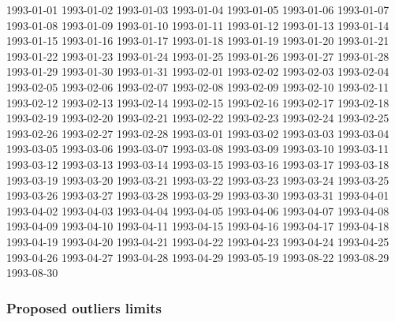 \documentclass[
  10pt,
  a4paper,oneside]{article}
\begin{document}
1993-01-01 1993-01-02 1993-01-03 1993-01-04 1993-01-05 1993-01-06 1993-01-07 1993-01-08 1993-01-09 1993-01-10 1993-01-11 1993-01-12 1993-01-13 1993-01-14 1993-01-15 1993-01-16 1993-01-17 1993-01-18 1993-01-19 1993-01-20 1993-01-21 1993-01-22 1993-01-23 1993-01-24 1993-01-25 1993-01-26 1993-01-27 1993-01-28 1993-01-29 1993-01-30 1993-01-31 1993-02-01 1993-02-02 1993-02-03 1993-02-04 1993-02-05 1993-02-06 1993-02-07 1993-02-08 1993-02-09 1993-02-10 1993-02-11 1993-02-12 1993-02-13 1993-02-14 1993-02-15 1993-02-16 1993-02-17 1993-02-18 1993-02-19 1993-02-20 1993-02-21 1993-02-22 1993-02-23 1993-02-24 1993-02-25 1993-02-26 1993-02-27 1993-02-28 1993-03-01 1993-03-02 1993-03-03 1993-03-04 1993-03-05 1993-03-06 1993-03-07 1993-03-08 1993-03-09 1993-03-10 1993-03-11 1993-03-12 1993-03-13 1993-03-14 1993-03-15 1993-03-16 1993-03-17 1993-03-18 1993-03-19 1993-03-20 1993-03-21 1993-03-22 1993-03-23 1993-03-24 1993-03-25 1993-03-26 1993-03-27 1993-03-28 1993-03-29 1993-03-30 1993-03-31 1993-04-01 1993-04-02 1993-04-03 1993-04-04 1993-04-05 1993-04-06 1993-04-07 1993-04-08 1993-04-09 1993-04-10 1993-04-11 1993-04-15 1993-04-16 1993-04-17 1993-04-18 1993-04-19 1993-04-20 1993-04-21 1993-04-22 1993-04-23 1993-04-24 1993-04-25 1993-04-26 1993-04-27 1993-04-28 1993-04-29 1993-05-19 1993-08-22 1993-08-29 1993-08-30

\hypertarget{proposed-outliers-limits}{%
\subsubsection{Proposed outliers limits}\label{proposed-outliers-limits}}

\footnotesize
\end{document}
